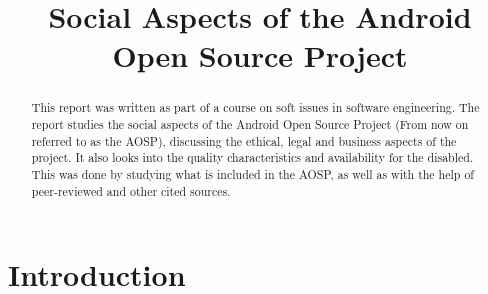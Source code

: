 \documentclass[conference]{IEEEtran}
\begin{document}
\title{Social Aspects of the Android Open Source Project}

\author{
{}
}


\maketitle


\begin{abstract}

This report was written as part of a course on soft issues in software engineering. The report studies the social aspects of the Android Open Source Project (From now on referred to as the AOSP), discussing the ethical, legal and business aspects of the project. It also looks into the quality characteristics and availability for the disabled. This was done by studying what is included in the AOSP, as well as with the help of peer-reviewed and other cited sources. 


\end{abstract}


\section{Introduction}
\label{intro}
\end{document}

